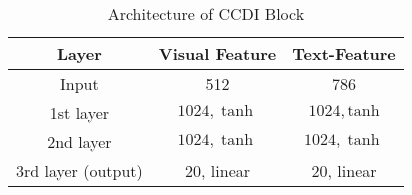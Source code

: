 

\begin{table}
{\small
\begin{tabular}{ccc}
\toprule 
\textbf{Layer} & \textbf{Visual Feature} & \textbf{Text-Feature}\\
\midrule
Input & 512 & 786 \\
1st layer & $1024, \tanh$ & $1024, \mathrm{tanh}$ \\
2nd layer & $1024, \tanh$ & $1024, \tanh$ \\
3rd layer (output) & 20, linear & 20, linear\\
\hline
\bottomrule
\end{tabular}
\caption{Architecture of CCDI Block}
\label{tab:albation_architectures}
}
\end{table}

